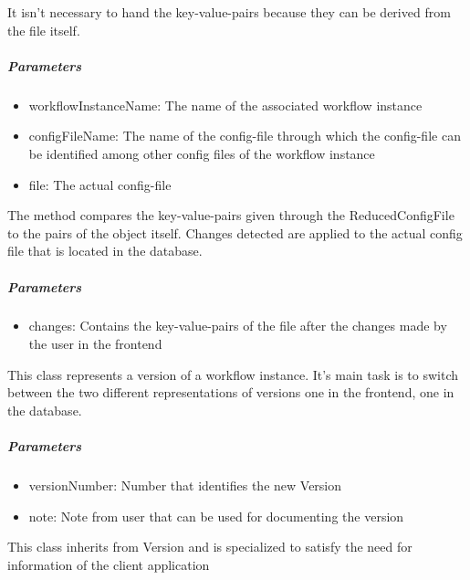It isn't necessary to hand the key-value-pairs because they can be derived from the file itself.

\subparagraph{Parameters}
\begin{itemize}
	\item{workflowInstanceName:}
	The name of the associated workflow instance
	\item{configFileName:}
	The name of the config-file through which the config-file can be identified among other config files of the workflow instance
	\item{file:}
	The actual config-file
\end{itemize}

\methods

The method compares the key-value-pairs given through the ReducedConfigFile to the pairs of the object itself. Changes detected are applied to the actual config file that is located in the database.

\subparagraph{Parameters}
\begin{itemize}
	\item{changes:}
	Contains the key-value-pairs of the file after the changes made by the user in the frontend
\end{itemize}


This class represents a version of a workflow instance. It's main task is to switch between the two different representations of versions one in the frontend, one in the database.
\constructor


\subparagraph{Parameters}
\begin{itemize}
	\item{versionNumber:}
	Number that identifies the new Version
	\item{note:}
	Note from user that can be used for documenting the version
\end{itemize}

This class inherits from Version and is specialized to satisfy the need for information of the client application
\constructor


